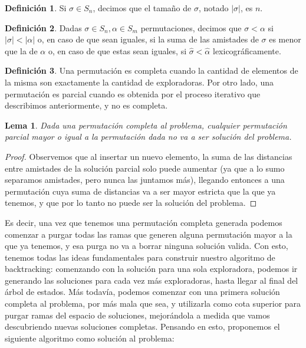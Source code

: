 \documentclass{article}
\newtheorem{lemma}{Lema}[theorem]
\theoremstyle{definition}
\newtheorem{definition}{Definición}[section]
\theoremstyle{remark}
\begin{document}
\begin{definition}
Si $\sigma \in S_n$, decimos que el tamaño de $\sigma$, notado $|\sigma|$, es $n$.
\end{definition}

\begin{definition}
Dadas $\sigma \in S_n, \alpha \in S_m$ permutaciones, decimos que $\sigma < \alpha$ si $|\sigma| < |\alpha|$ o, en caso de que sean iguales, si la suma de las amistades de $\sigma$ es menor que la de $\alpha$ o, en caso de que estas sean iguales, si $\hat{\sigma} < \hat{\alpha}$ lexicográficamente.
\end{definition}

\begin{definition}
Una permutación es completa cuando la cantidad de elementos de la misma son exactamente la cantidad de exploradoras. Por otro lado, una permutación es parcial cuando es obtenida por el proceso iterativo que describimos anteriormente, y no es completa.
\end{definition}

\begin{lemma}
Dada una permutación completa al problema, cualquier permutación parcial mayor o igual a la permutación dada no va a ser solución del problema.
\end{lemma}

\begin{proof}
Observemos que al insertar un nuevo elemento, la suma de las distancias entre amistades de la solución parcial solo puede aumentar (ya que a lo sumo separamos amistades, pero nunca las juntamos más), llegando entonces a una permutación cuya suma de distancias va a ser mayor estricta que la que ya tenemos, y que por lo tanto no puede ser la solución del problema.
\end{proof}

Es decir, una vez que tenemos una permutación completa generada podemos comenzar a purgar todas las ramas que generen alguna permutación mayor a la que ya tenemos, y esa purga no va a borrar ninguna solución valida. Con esto, tenemos todas las ideas fundamentales para construir nuestro algoritmo de backtracking: comenzando con la solución para una sola exploradora, podemos ir generando las soluciones para cada vez más exploradoras, hasta llegar al final del árbol de estados. Más todavía, podemos comenzar con una primera solución completa al problema, por más mala que sea, y utilizarla como cota superior para purgar ramas del espacio de soluciones, mejorándola a medida que vamos descubriendo nuevas soluciones completas. Pensando en esto, proponemos el siguiente algoritmo como solución al problema:
\end{document}
